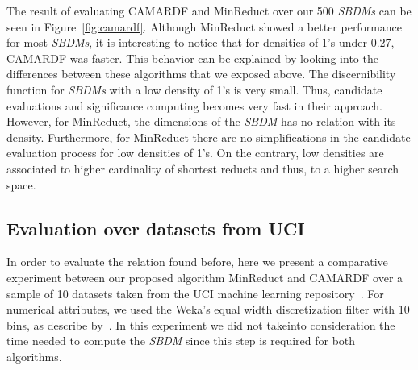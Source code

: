 \documentclass[authoryear,11pt]{elsarticle}
\begin{document}
   The result of evaluating CAMARDF and MinReduct over our 500 \textit{SBDMs} can be seen in Figure~\ref{fig:camardf}. Although MinReduct showed a better performance for most \textit{SBDMs}, it is interesting to notice that for densities of 1's under 0.27, CAMARDF was faster. This behavior can be explained by looking into the differences between these algorithms that we exposed above. The discernibility function for \textit{SBDMs} with a low density of 1's is very small. Thus, candidate evaluations and significance computing becomes very fast in their approach. However, for MinReduct, the dimensions of the \textit{SBDM} has no relation with its density. Furthermore, for MinReduct there are no simplifications in the candidate evaluation process for low densities of 1's. On the contrary, low densities are associated to higher cardinality of shortest reducts and thus, to a higher search space.
   
\subsection{Evaluation over datasets from UCI}

  In order to evaluate the relation found before, here we present a comparative experiment between our proposed algorithm MinReduct and CAMARDF over a sample of 10 datasets taken from the UCI machine learning repository~\citep{Bache13}. For numerical attributes, we used the Weka's equal width discretization filter with 10 bins, as describe by~\cite{Flores2010}. In this experiment we did not takeinto consideration the time needed to compute the \textit{SBDM} since this step is required for both algorithms. 
\end{document}
